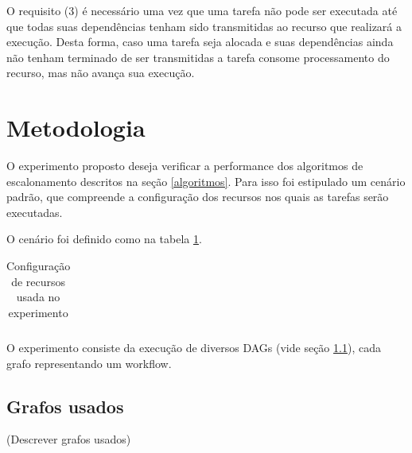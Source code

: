 \documentclass[a4paper,10pt]{article}
\begin{document}
O requisito (3) é necessário uma vez que uma tarefa não pode ser executada até que todas
suas dependências tenham sido transmitidas ao recurso que realizará a execução. Desta forma,
caso uma tarefa seja alocada e suas dependências ainda não tenham terminado de ser transmitidas
a tarefa consome processamento do recurso, mas não avança sua execução.

\section{Metodologia}

O experimento proposto deseja verificar a performance dos algoritmos de escalonamento
descritos na seção \ref{algoritmos}. Para isso foi estipulado um cenário padrão, que
compreende a configuração dos recursos nos quais as tarefas serão executadas.

O cenário foi definido como na tabela \ref{tab:datacenter}.

\begin{table}
\centering

  \begin{tabular}{|l|l|}  


  \end{tabular}
  \caption{Configuração de recursos usada no experimento}
  \label{tab:datacenter}
\end{table}

O experimento consiste da execução de diversos DAGs (vide seção \ref{grafosusados}),
cada grafo representando um workflow.


\subsection{Grafos usados}
\label{grafosusados}

(Descrever grafos usados)
\end{document}
